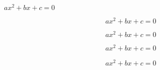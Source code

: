 \documentclass{article}
\begin{document}
$ax^2 + bx + c = 0$

$$ax^2 + bx + c = 0$$

\[
 ax^2 + bx + c = 0
\]

\begin{equation}
 ax^2 + bx + c = 0
\end{equation}

\begin{align}
 ax^2 + bx + c = 0
\end{align}
\end{document}
